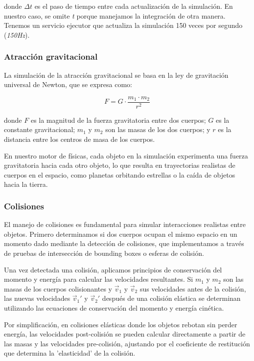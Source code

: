 donde \(\Delta t\) es el paso de tiempo entre cada actualización de la simulación. En nuestro caso, se omite \textit{t} porque manejamos la integración de otra manera. Tenemos un servicio ejecutor que actualiza la simulación 150 veces por segundo (\textit{150Hz}).

\subsubsection{Atracción gravitacional}
La simulación de la atracción gravitacional se basa en la ley de gravitación universal de Newton, que se expresa como:

\begin{equation}
\label{eq3}
    F = G \cdot \frac{m_1 \cdot m_2}{r^2}
\end{equation}

donde \(F\) es la magnitud de la fuerza gravitatoria entre dos cuerpos; \(G\) es la constante gravitacional; \(m_1\) y \(m_2\) son las masas de los dos cuerpos; y \(r\) es la distancia entre los centros de masa de los cuerpos.

En nuestro motor de físicas, cada objeto en la simulación experimenta una fuerza gravitatoria hacia cada otro objeto, lo que resulta en trayectorias realistas de cuerpos en el espacio, como planetas orbitando estrellas o la caída de objetos hacia la tierra.

\subsubsection{Colisiones}
El manejo de colisiones es fundamental para simular interacciones realistas entre objetos. Primero determinamos si dos cuerpos ocupan el mismo espacio en un momento dado mediante la detección de colisiones, que implementamos a través de pruebas de intersección de bounding boxes o esferas de colisión.

Una vez detectada una colisión, aplicamos principios de conservación del momento y energía para calcular las velocidades resultantes. Si \(m_1\) y \(m_2\) son las masas de los cuerpos colisionantes y \(\vec{v}_1\) y \(\vec{v}_2\) sus velocidades antes de la colisión, las nuevas velocidades \(\vec{v}_1'\) y \(\vec{v}_2'\) después de una colisión elástica se determinan utilizando las ecuaciones de conservación del momento y energía cinética.

Por simplificación, en colisiones elásticas donde los objetos rebotan sin perder energía, las velocidades post-colisión se pueden calcular directamente a partir de las masas y las velocidades pre-colisión, ajustando por el coeficiente de restitución que determina la 'elasticidad' de la colisión.

